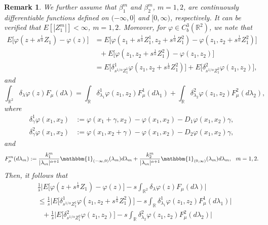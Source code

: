 \documentclass[a4paper,oneside,10pt]{article}%
\newtheorem{remark}[theorem]{Remark}
\numberwithin{equation}{section}
\begin{document}
\begin{remark}
We further assume that $\beta_{1}^{m}$ and $\beta_{2}^{m}$, $m=1,2$, are
continuously differentiable functions defined on $(-\infty,0]$ and
$[0,\infty)$, respectively. It can be verified that $E[|Z_{1}^{m}|]<\infty$,
$m=1,2$. Moreover, for $\varphi \in C_{b}^{3}(\mathbb{R}^{2})$, we note that
\begin{align*}
E\big[\varphi(z+s^{\frac{1}{\alpha}}Z_{1})-\varphi(z)\big]  &  =E\big[\varphi
(z_{1}+s^{\frac{1}{\alpha}}Z_{1}^{1},z_{2}+s^{\frac{1}{\alpha}}Z_{1}
^{2})-\varphi(z_{1},z_{2}+s^{\frac{1}{\alpha}}Z_{1}^{2})\big]\\
&  \text{ \  \ }+E\big[\varphi(z_{1},z_{2}+s^{\frac{1}{\alpha}}Z_{1}
^{2})-\varphi(z_{1},z_{2})\big]\\
&  =E\big[\delta_{s^{1/\alpha}Z_{1}^{1}}^{1}\varphi(z_{1},z_{2}+s^{\frac
{1}{\alpha}}Z_{1}^{2})\big]+E\big[\delta_{s^{1/\alpha}Z_{1}^{2}}^{2}%
\varphi(z_{1},z_{2})\big],
\end{align*}
and
\[
\int_{\mathbb{R}^{2}}\delta_{\lambda}\varphi(z)F_{\mu}(d\lambda)=\int
_{\mathbb{R}}\delta_{\lambda_{1}}^{1}\varphi(z_{1},z_{2})F_{\mu}^{1}
(d\lambda_{1})+\int_{\mathbb{R}}\delta_{\lambda_{2}}^{2}\varphi(z_{1}
,z_{2})F_{\mu}^{2}(d\lambda_{2}),
\]
where
\begin{align*}
\delta_{\gamma}^{1}\varphi(x_{1},x_{2})  &  :=\varphi(x_{1}+\gamma
,x_{2})-\varphi(x_{1},x_{2})-D_{1}\varphi(x_{1},x_{2})\gamma,\\
\delta_{\gamma}^{2}\varphi(x_{1},x_{2})  &  :=\varphi(x_{1},x_{2}
+\gamma)-\varphi(x_{1},x_{2})-D_{2}\varphi(x_{1},x_{2})\gamma,
\end{align*}
and
\[
F_{\mu}^{m}(d\lambda_{m}):=\frac{k_{1}^{m}}{|\lambda_{m}|^{\alpha+1}
}\mathbbm{1}_{(-\infty,0)}(\lambda_{m})d\lambda_{m}+\frac{k_{2}^{m}}
{|\lambda_{m}|^{\alpha+1}}\mathbbm{1}_{(0,\infty)}(\lambda_{m})d\lambda
_{m},\text{ \ }m=1,2.
\]
Then, it follows that
\begin{align*}
&  \frac{1}{s}\bigg \vert E\big[\varphi(z+s^{\frac{1}{\alpha}}Z_{1}
)-\varphi(z)\big]-s\int_{\mathbb{R}^{2}}\delta_{\lambda}\varphi(z)F_{\mu
}(d\lambda)\bigg \vert \\
&  \leq \frac{1}{s}\bigg \vert E\big[\delta_{s^{1/\alpha}Z_{1}^{1}}^{1}
\varphi(z_{1},z_{2}+s^{\frac{1}{\alpha}}Z_{1}^{2})\big]-s\int_{\mathbb{R}
}\delta_{\lambda_{1}}^{1}\varphi(z_{1},z_{2})F_{\mu}^{1}(d\lambda
_{1})\bigg \vert \\
&  \text{ \  \ }+\frac{1}{s}\bigg \vert E\big[\delta_{s^{1/\alpha}Z_{1}^{2}
}^{2}\varphi(z_{1},z_{2})\big]-s\int_{\mathbb{R}}\delta_{\lambda_{2}}
^{2}\varphi(z_{1},z_{2})F_{\mu}^{2}(d\lambda_{2})\bigg \vert \\

\end{align*}
\end{remark}
\end{document}
